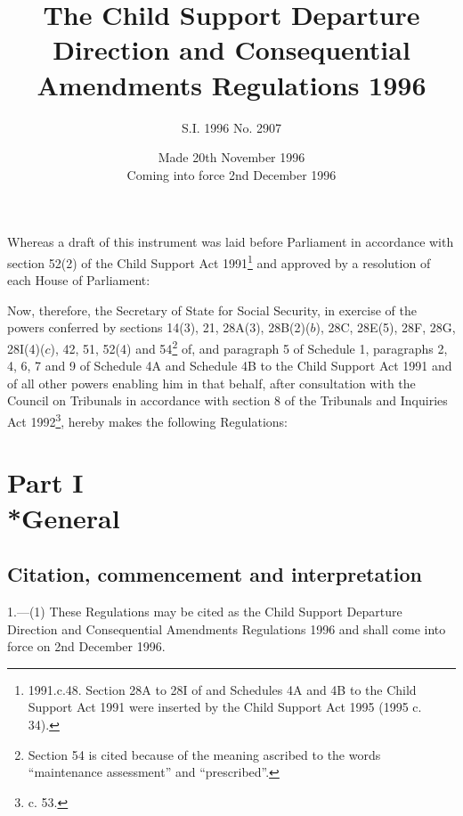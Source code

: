 \documentclass[a4paper]{article}
\title{The Child Support Departure Direction and Consequential Amendments
Regulations 1996}
\author{S.I. 1996 No. 2907}
\date{Made 20th November 1996\\Coming into force 2nd December 1996
}
\newcommand{\parthead}{}
\begin{document}
\maketitle

\noindent
Whereas a draft of this instrument was laid before Parliament in accordance with
section 52(2) of the Child Support Act 1991\footnote{\frenchspacing 1991.c.48.
Section 28A to 28I of and Schedules 4A and 4B to the Child Support Act 1991 were
inserted by the Child Support Act 1995 (1995 c. 34).} and approved by a
resolution of each House of Parliament:

Now, therefore, the Secretary of State for Social Security, in exercise of the
powers conferred by sections 14(3), 21, 28A(3), 28B(2)($b$), 28C, 28E(5), 28F,
28G, 28I(4)($c$), 42, 51, 52(4) and 54\footnote{\frenchspacing Section 54 is cited
because of the meaning ascribed to the words “maintenance assessment” and
“prescribed”.} of, and paragraph 5 of Schedule 1, paragraphs 2, 4, 6, 7 and 9 of
Schedule 4A and Schedule 4B to the Child Support Act 1991 and of all other
powers enabling him in that behalf, after consultation with the Council on
Tribunals in accordance with section 8 of the Tribunals and Inquiries Act
1992\footnote{ c. 53.}, hereby makes the following
Regulations:

{\sloppy

\tableofcontents

}

\setcounter{secnumdepth}{-2}

\section[Part I --- General]{Part I\\*General}

\subsection[1. Citation, commencement and interpretation]{Citation, commencement and interpretation}

\renewcommand\parthead{--- Part I}

1.—(1) These Regulations
may be cited as the Child Support Departure Direction and Consequential
Amendments Regulations 1996 and shall come into force on 2nd December 1996.
\end{document}
